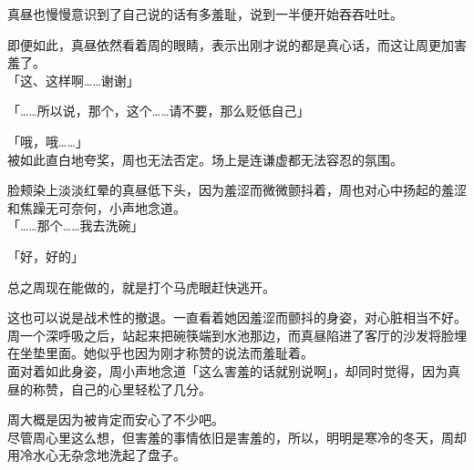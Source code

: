 真昼也慢慢意识到了自己说的话有多羞耻，说到一半便开始吞吞吐吐。

即便如此，真昼依然看着周的眼睛，表示出刚才说的都是真心话，而这让周更加害羞了。\\

「这、这样啊……谢谢」

「……所以说，那个，这个……请不要，那么贬低自己」

「哦，哦……」\\

被如此直白地夸奖，周也无法否定。场上是连谦虚都无法容忍的氛围。

脸颊染上淡淡红晕的真昼低下头，因为羞涩而微微颤抖着，周也对心中扬起的羞涩和焦躁无可奈何，小声地念道。\\

「……那个……我去洗碗」

「好，好的」

总之周现在能做的，就是打个马虎眼赶快逃开。

这也可以说是战术性的撤退。一直看着她因羞涩而颤抖的身姿，对心脏相当不好。\\

周一个深呼吸之后，站起来把碗筷端到水池那边，而真昼陷进了客厅的沙发将脸埋在坐垫里面。她似乎也因为刚才称赞的说法而羞耻着。\\

面对着如此身姿，周小声地念道「这么害羞的话就别说啊」，却同时觉得，因为真昼的称赞，自己的心里轻松了几分。

周大概是因为被肯定而安心了不少吧。\\

尽管周心里这么想，但害羞的事情依旧是害羞的，所以，明明是寒冷的冬天，周却用冷水心无杂念地洗起了盘子。
